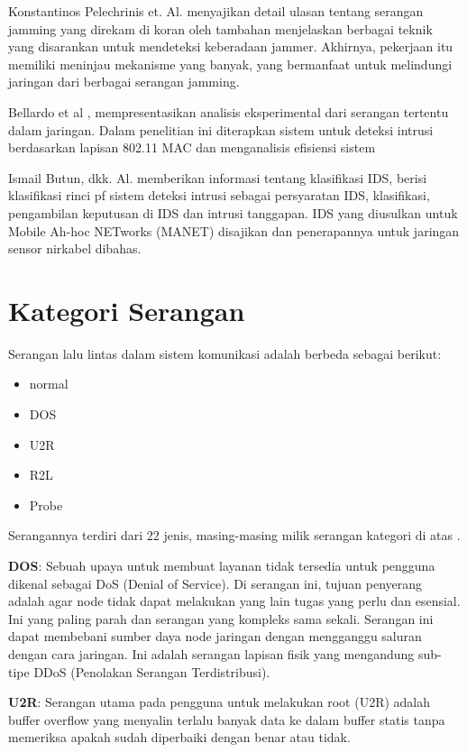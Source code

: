 \documentclass[conference]{IEEEtran}
\begin{document}
    Konstantinos Pelechrinis et. Al. \cite {pelechrinis2010denial} menyajikan detail ulasan tentang serangan jamming yang direkam di koran oleh tambahan menjelaskan berbagai teknik yang disarankan untuk mendeteksi keberadaan jammer. Akhirnya, pekerjaan itu memiliki meninjau mekanisme yang banyak, yang bermanfaat untuk melindungi jaringan dari berbagai serangan jamming.
    
    Bellardo et al \cite {bellardo2003802}, mempresentasikan analisis eksperimental dari serangan tertentu dalam jaringan. Dalam penelitian ini diterapkan sistem untuk deteksi intrusi berdasarkan lapisan 802.11 MAC dan menganalisis efisiensi sistem
    
    Ismail Butun, dkk. Al. \cite {zhang2000intrusion} memberikan informasi tentang klasifikasi IDS, berisi klasifikasi rinci pf sistem deteksi intrusi sebagai persyaratan IDS, klasifikasi, pengambilan keputusan di IDS dan intrusi tanggapan. IDS yang diusulkan untuk Mobile Ah-hoc NETworks (MANET) disajikan dan penerapannya untuk jaringan sensor nirkabel dibahas.
    
\section{Kategori Serangan}
Serangan lalu lintas dalam sistem komunikasi adalah
berbeda sebagai berikut:

\begin{itemize}
    \item normal
    \item DOS
    \item U2R
    \item R2L
    \item Probe
\end{itemize}

Serangannya terdiri dari 22 jenis, masing-masing milik serangan
kategori di atas \cite {butun2013survey}.

\textbf{DOS}: Sebuah upaya untuk membuat layanan
tidak tersedia untuk pengguna dikenal sebagai DoS (Denial of Service). Di
serangan ini, tujuan penyerang adalah agar node tidak dapat melakukan yang lain
tugas yang perlu dan esensial. Ini yang paling parah dan
serangan yang kompleks sama sekali. Serangan ini dapat membebani sumber daya
node jaringan dengan mengganggu saluran dengan cara jaringan.
Ini adalah serangan lapisan fisik yang mengandung sub-tipe DDoS
(Penolakan Serangan Terdistribusi).

\textbf{U2R}: Serangan utama pada pengguna untuk melakukan root
(U2R) adalah buffer overflow yang menyalin terlalu banyak data ke dalam
buffer statis tanpa memeriksa apakah sudah diperbaiki dengan benar atau tidak.
\end{document}
